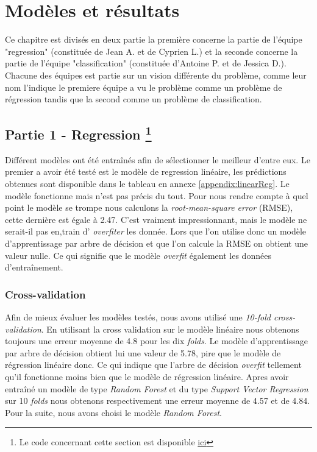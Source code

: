 \chapter{Modèles et résultats}
Ce chapitre est divisés en deux partie la première concerne la partie de l'équipe "regression" (constituée de Jean A. et de Cyprien L.) et la seconde concerne la partie de l'équipe "classification" (constituée d'Antoine P. et de Jessica D.). Chacune des équipes est partie sur un vision différente du problème, comme leur nom l'indique le premiere équipe a vu le problème comme un problème de régression tandis que la second comme un problème de classification.

\section[Partie 1 - Regression]{Partie 1 - Regression \footnote{Le code concernant cette section est disponible \href{https://github.com/jalbrecq/CanYouCatchIt/blob/main/machine_learning/notebook/CanYouCatchIt_3of3.ipynb}{ici}}}

Différent modèles ont été entraînés afin de sélectionner le meilleur d'entre eux. Le premier a avoir été testé est le modèle de regression linéaire, les prédictions obtenues sont disponible dans le tableau en annexe \ref{appendix:linearReg}. Le modèle fonctionne mais n'est pas précis du tout. Pour nous rendre compte à quel point le modèle se trompe nous calculons la  \textit{root-mean-square error} (RMSE), cette dernière est égale à 2.47. C'est vraiment impressionnant, mais le modèle ne serait-il pas en,train d' \textit{overfiter} les donnée. Lors que l'on utilise donc un modèle d'apprentissage par arbre de décision et que l'on calcule la RMSE on obtient une valeur nulle. Ce qui signifie que le modèle \textit{overfit} également les données d'entraînement.

\subsection{Cross-validation}
Afin de mieux évaluer les modèles testés, nous avons utilisé une \textit{10-fold cross-validation}. En utilisant la cross validation sur le modèle linéaire nous obtenons toujours une erreur moyenne de 4.8 pour les dix \textit{folds}. Le modèle d'apprentissage par arbre de décision obtient lui une valeur de 5.78, pire que le modèle de régression linéaire donc. Ce qui indique que l'arbre de décision \textit{overfit} tellement qu'il fonctionne moins bien que le modèle de régression linéaire. Apres avoir entraîné un modèle de type \textit{Random Forest} et du type \textit{Support Vector Regression} sur 10 \textit{folds} nous obtenons respectivement une erreur moyenne de 4.57 et de 4.84. Pour la suite, nous avons choisi le modèle \textit{Random Forest}.

